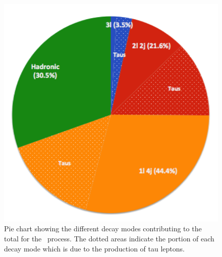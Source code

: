 \begin{figure}
\centering
\includegraphics[scale=.8]{figures/branching_fractions.png}
\caption{Pie chart showing the different decay modes contributing 
to the total \xsec for the \www~process. 
The dotted areas indicate the portion of each decay 
mode which is due to the production of tau leptons.}
\label{fig:branching_fractions}
\end{figure}








%







